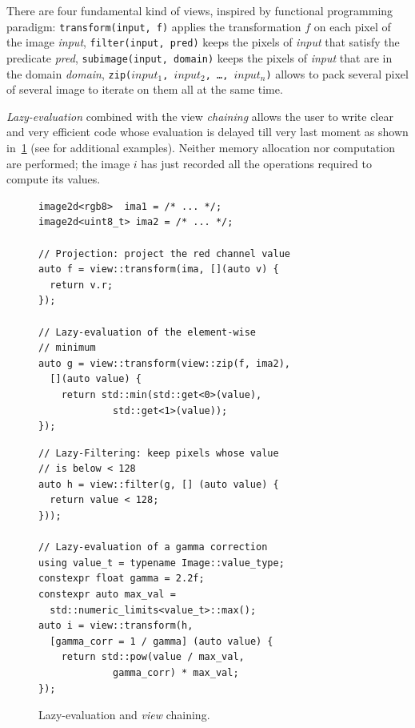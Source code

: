 There are four fundamental kind of views, inspired by functional programming paradigm: \texttt{transform(input, f)}
applies the transformation $f$ on each pixel of the image \emph{input}, \texttt{filter(input, pred)} keeps the pixels of
\emph{input} that satisfy the predicate \emph{pred}, \texttt{subimage(input, domain)} keeps the pixels of \emph{input}
that are in the domain \emph{domain}, \texttt{zip($input_1$, $input_2$, \ldots, $input_n$)} allows to pack several pixel
of several image to iterate on them all at the same time.

\emph{Lazy-evaluation} combined with the view \emph{chaining} allows the user to write clear and very efficient code
whose evaluation is delayed till very last moment as shown in~\cref{fig.lazy} (see \cite{geraud.2018.gtgdmm} for
additional examples). Neither memory allocation nor computation are performed; the image $i$ has just recorded all the
operations required to compute its values.

\begin{figure}[htbp]
  \begin{minipage}[l]{0.48\linewidth}
    \begin{verbatim}
image2d<rgb8>  ima1 = /* ... */;
image2d<uint8_t> ima2 = /* ... */;

// Projection: project the red channel value
auto f = view::transform(ima, [](auto v) {
  return v.r;
});

// Lazy-evaluation of the element-wise
// minimum
auto g = view::transform(view::zip(f, ima2),
  [](auto value) {
    return std::min(std::get<0>(value),
             std::get<1>(value));
});
\end{verbatim}
  \end{minipage}
  \hfill
  \begin{minipage}[l]{0.48\linewidth}
    \begin{verbatim}
// Lazy-Filtering: keep pixels whose value
// is below < 128
auto h = view::filter(g, [] (auto value) {
  return value < 128;
}));

// Lazy-evaluation of a gamma correction
using value_t = typename Image::value_type;
constexpr float gamma = 2.2f;
constexpr auto max_val =
  std::numeric_limits<value_t>::max();
auto i = view::transform(h,
  [gamma_corr = 1 / gamma] (auto value) {
    return std::pow(value / max_val,
             gamma_corr) * max_val;
});
\end{verbatim}
  \end{minipage}

  \caption{Lazy-evaluation and \emph{view} chaining.}
  \label{fig.lazy}
\end{figure}


